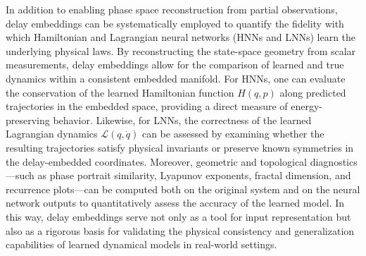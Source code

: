 \documentclass{article}
\begin{document}
In addition to enabling phase space reconstruction from partial observations, delay embeddings can be systematically employed to quantify the fidelity with which Hamiltonian and Lagrangian neural networks (HNNs and LNNs) learn the underlying physical laws. By reconstructing the state-space geometry from scalar measurements, delay embeddings allow for the comparison of learned and true dynamics within a consistent embedded manifold. For HNNs, one can evaluate the conservation of the learned Hamiltonian function \( H(q, p) \) along predicted trajectories in the embedded space, providing a direct measure of energy-preserving behavior. Likewise, for LNNs, the correctness of the learned Lagrangian dynamics \( \mathcal{L}(q, \dot{q}) \) can be assessed by examining whether the resulting trajectories satisfy physical invariants or preserve known symmetries in the delay-embedded coordinates. Moreover, geometric and topological diagnostics—such as phase portrait similarity, Lyapunov exponents, fractal dimension, and recurrence plots—can be computed both on the original system and on the neural network outputs to quantitatively assess the accuracy of the learned model. In this way, delay embeddings serve not only as a tool for input representation but also as a rigorous basis for validating the physical consistency and generalization capabilities of learned dynamical models in real-world settings.
\end{document}
